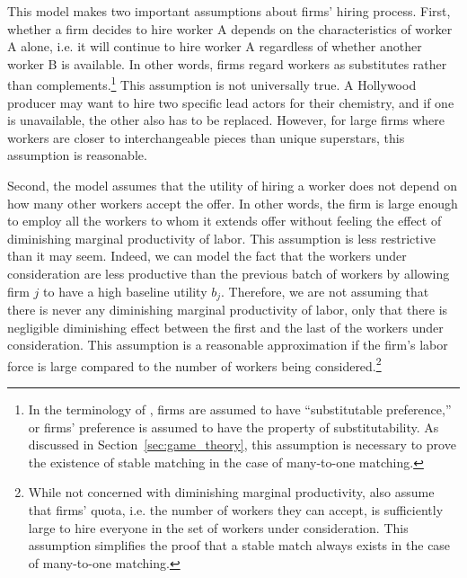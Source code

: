This model makes two important assumptions about firms' hiring process. First,
whether a firm decides to hire worker A depends on the characteristics of worker
A alone, i.e. it will continue to hire worker A regardless of whether another
worker B is available. In other words, firms regard workers as substitutes
rather than complements.\footnote{In the terminology of \citet{Roth1992}, firms
  are assumed to have ``substitutable preference,'' or firms' preference is
  assumed to have the property of substitutability. As discussed in
  Section~\ref{sec:game_theory}, this assumption is necessary to prove the
  existence of stable matching in the case of many-to-one matching.} This
assumption is not universally true. A Hollywood producer may want to hire two
specific lead actors for their chemistry, and if one is unavailable, the other
also has to be replaced. However, for large firms where workers are closer to
interchangeable pieces than unique superstars, this assumption is reasonable.

Second, the model assumes that the utility of hiring a worker does not depend on
how many other workers accept the offer. In other words, the firm is large
enough to employ all the workers to whom it extends offer without feeling the
effect of diminishing marginal productivity of labor. This assumption is less
restrictive than it may seem. Indeed, we can model the fact that the workers
under consideration are less productive than the previous batch of workers by
allowing firm $j$ to have a high baseline utility $b_j$. Therefore, we are not
assuming that there is never any diminishing marginal productivity of labor,
only that there is negligible diminishing effect between the first and the last
of the workers under consideration. This assumption is a reasonable
approximation if the firm's labor force is large compared to the number of
workers being considered.\footnote{While not concerned with diminishing marginal
  productivity, \citet{Roth1992} also assume that firms' quota, i.e. the number
  of workers they can accept, is sufficiently large to hire everyone in the set
  of workers under consideration. This assumption simplifies the proof that a
  stable match always exists in the case of many-to-one matching.}

